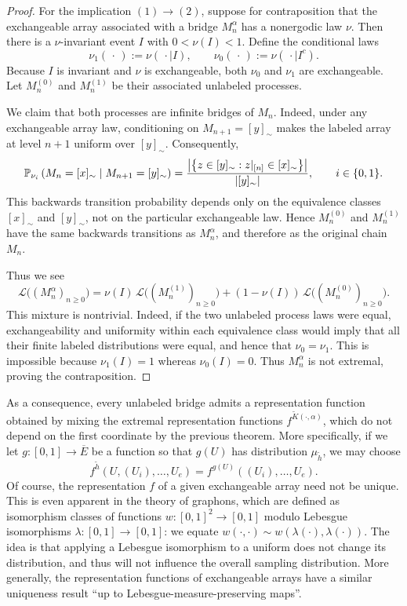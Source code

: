 \begin{proof}
For the implication $(1) \to (2)$, suppose for contraposition that the
exchangeable array associated with a bridge $M_n^\alpha$ has a nonergodic law
$\nu$. Then there is a $\nu$-invariant event $I$ with $0<\nu(I)<1$. Define
the conditional laws
\[
    \nu_1(\,\cdot\,) := \nu(\,\cdot\mid I),
    \qquad
    \nu_0(\,\cdot\,) := \nu(\,\cdot\mid I^c).
\]
Because $I$ is invariant and $\nu$ is exchangeable, both $\nu_0$ and $\nu_1$
are exchangeable. Let $M_n^{(0)}$ and $M_n^{(1)}$ be their associated
unlabeled processes.

We claim that both processes are infinite bridges of $M_n$. Indeed, under any
exchangeable array law, conditioning on $M_{n+1}=[y]_\sim$ makes the labeled
array at level $n+1$ uniform over $[y]_\sim$. Consequently,
\[
    \P_{\nu_i}\left(M_n=[x]_\sim\mid M_{n+1}=[y]_\sim\right)
    =
    \frac{\left|\left\{z\in[y]_\sim:z|_{[n]}\in[x]_\sim\right\}\right|}
         {|[y]_\sim|},
    \qquad i\in\{0,1\}.
\]
This backwards transition probability depends only on the equivalence classes
$[x]_\sim$ and $[y]_\sim$, not on the particular exchangeable law. Hence
$M_n^{(0)}$ and $M_n^{(1)}$ have the same backwards transitions as
$M_n^\alpha$, and therefore as the original chain $M_n$.

Thus we see
\[
    \mathcal{L}\bigl((M_n^\alpha)_{n\geq0}\bigr)
    = \nu(I)\,\mathcal{L}\bigl((M_n^{(1)})_{n\geq0}\bigr)
      +(1-\nu(I))\,\mathcal{L}\bigl((M_n^{(0)})_{n\geq0}\bigr).
\]
This mixture is nontrivial. Indeed, if the two unlabeled process laws were
equal, exchangeability and uniformity within each equivalence class would
imply that all their finite labeled distributions were equal, and hence that
$\nu_0=\nu_1$. This is impossible because $\nu_1(I)=1$ whereas
$\nu_0(I)=0$. Thus $M_n^\alpha$ is not extremal, proving the contraposition.
\end{proof}

As a consequence, every unlabeled bridge admits a representation function
obtained by mixing the extremal representation
functions $f^{\tilde{K}(\cdot,\alpha)}$, which do not depend on the first
coordinate by the previous theorem. More specifically, if we
let $g: [0,1] \to \overline{E}$ be a function so that $g(U)$ has distribution
 $\mu_{\tilde{h}}$, we may choose
    \[f^{\tilde{h}}(U, (U_i), \ldots, U_e) = f^{g(U)}((U_i), \ldots, U_e).\]
\noindent Of course, the representation $f$ of a given exchangeable array
need not be unique. This is even apparent in the theory of graphons, which
are defined as isomorphism classes of functions $w:[0,1]^2 \to [0,1]$ modulo
Lebesgue isomorphisms $\lambda:[0,1] \to [0,1]$: we equate $w(\cdot, \cdot) \sim w(\lambda(\cdot), \lambda(\cdot))$.
The idea is that applying a Lebesgue isomorphism to a uniform does not change
its distribution, and thus will not influence the overall sampling distribution.
More generally, the representation functions of exchangeable arrays have a
similar uniqueness result ``up to Lebesgue-measure-preserving maps''.

